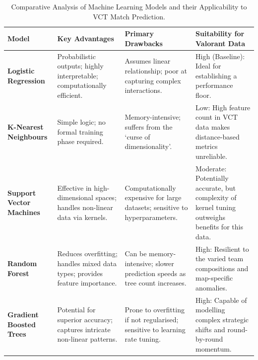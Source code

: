 \begin{table}
    \centering
    \small
    \begin{tabularx}{\linewidth}{@{} l >{\raggedright\arraybackslash}X >{\raggedright\arraybackslash}X >{\raggedright\arraybackslash}p{3.5cm} @{}}
        \toprule
        \textbf{Model} & \textbf{Key Advantages} & \textbf{Primary Drawbacks} & \textbf{Suitability for Valorant Data} \\ 
        \midrule
        
        \textbf{Logistic Regression} & 
        Probabilistic outputs; highly interpretable; computationally efficient. & 
        Assumes linear relationship; poor at capturing complex interactions. & 
        High (Baseline): Ideal for establishing a performance floor. \\
        \addlinespace
        
        \midrule
        \textbf{K-Nearest Neighbours} & 
        Simple logic; no formal training phase required. & 
        Memory-intensive; suffers from the `curse of dimensionality'. & 
        Low: High feature count in VCT data makes distance-based metrics unreliable. \\
        \addlinespace
        
        \midrule
        \textbf{Support Vector Machines} & 
        Effective in high-dimensional spaces; handles non-linear data via kernels. & 
        Computationally expensive for large datasets; sensitive to hyperparameters. & 
        Moderate: Potentially accurate, but complexity of kernel tuning outweighs benefits for this data. \\
        \addlinespace
        
        \midrule
        \textbf{Random Forest} & 
        Reduces overfitting; handles mixed data types; provides feature importance. & 
        Can be memory-intensive; slower prediction speeds as tree count increases. & 
        High: Resilient to the varied team compositions and map-specific anomalies. \\
        \addlinespace
        
        \midrule
        \textbf{Gradient Boosted Trees} & 
        Potential for superior accuracy; captures intricate non-linear patterns. & 
        Prone to overfitting if not regularised; sensitive to learning rate tuning. & 
        High: Capable of modelling complex strategic shifts and round-by-round momentum. \\
        \bottomrule
    \end{tabularx}
    \caption{Comparative Analysis of Machine Learning Models and their Applicability to VCT Match Prediction.}
    \label{tab:MLModelProsCons}
\end{table}

